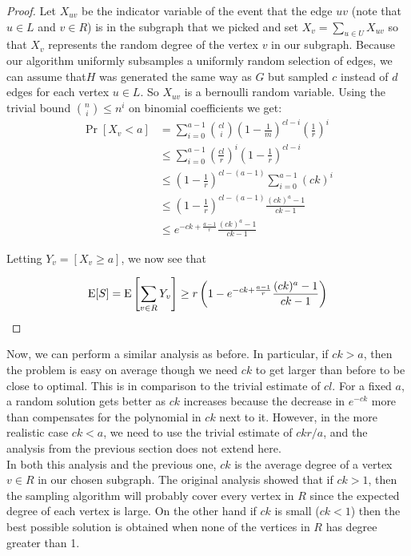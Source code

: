 \begin{proof}
Let $X_{uv}$ be the indicator variable of the event that the edge $uv$
(note that $u\in L$ and $v\in R$) is in the subgraph that we picked
and set $X_{v} = \sum_{u\in U} X_{uv}$ so that $X_{v}$ represents the
random degree of the vertex $v$ in our subgraph. Because our algorithm
uniformly subsamples a uniformly random selection of edges, we can
assume that$H$ was generated the same way as $G$ but sampled $c$
instead of $d$ edges for each vertex $u\in L$. So $X_{uv}$ is a
bernoulli random variable. Using the trivial bound $\binom{n}{i}
\leq n^i$ on binomial coefficients we get:
\begin{align*}
      \Pr[X_v < a]
&=    \sum_{i=0}^{a-1} \binom{cl}{i} \left(1-\frac{1}{m}\right)^{cl-i}\left(\frac{1}{r}\right)^i \\
&\leq \sum_{i=0}^{a-1} \left(\frac{cl}{r}\right)^i\left(1-\frac{1}{r}\right)^{cl-i} \\
&\leq    \left(1-\frac{1}{r}\right)^{cl-(a-1)}\sum_{i=0}^{a-1} (ck)^i \\
&\leq \left(1-\frac{1}{r}\right)^{cl-(a-1)}\frac{(ck)^a-1}{ck-1} \\
&\leq e^{-ck+\frac{a-1}{r}} \frac{(ck)^a-1}{ck-1}
\end{align*}


Letting $Y_v = \left[X_v \geq a\right]$, we now see that

\[ \text{E}[S] = \text{E}\left[\sum_{v\in R} Y_v\right] \geq r\left(1-e^{-ck+\frac{a-1}{r}} \frac{(ck)^a-1}{ck-1}\right) \]
\end{proof}

Now, we can perform a similar analysis as before. In
particular, if $ck>a$, then the problem is easy on average though we
need $ck$ to get larger than before to be close to optimal. This
is in comparison to the trivial estimate of $cl$. For a fixed $a$, a
random solution gets better as $ck$ increases because the decrease in
$e^{-ck}$ more than compensates for the polynomial in $ck$ next to
it. However, in the more realistic case $ck<a$, we need to use the trivial estimate of $ckr/a$, and the analysis from the previous section does not extend
here. \\



In both this analysis and the previous one, $ck$ is the average degree
of a vertex $v\in R$ in our chosen subgraph. The original analysis showed that if $ck>1$, then the sampling algorithm will probably cover every vertex in $R$ since the expected degree of each vertex is large. On the other hand if $ck$ is small ($ck < 1$) then the best possible solution is obtained when none of the vertices
in $R$ has degree greater than 1. 

